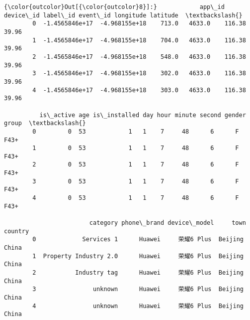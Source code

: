 \documentclass[11pt]{article}
\begin{document}
\begin{Verbatim}[commandchars=\\\{\}]
{\color{outcolor}Out[{\color{outcolor}8}]:}            app\_id      device\_id label\_id event\_id longitude latitude  \textbackslash{}
        0  -1.4565846e+17  -4.968155e+18    713.0   4633.0    116.38    39.96   
        1  -1.4565846e+17  -4.968155e+18    704.0   4633.0    116.38    39.96   
        2  -1.4565846e+17  -4.968155e+18    548.0   4633.0    116.38    39.96   
        3  -1.4565846e+17  -4.968155e+18    302.0   4633.0    116.38    39.96   
        4  -1.4565846e+17  -4.968155e+18    303.0   4633.0    116.38    39.96   
        
          is\_active age is\_installed day hour minute second gender group  \textbackslash{}
        0         0  53            1   1    7     48      6      F  F43+   
        1         0  53            1   1    7     48      6      F  F43+   
        2         0  53            1   1    7     48      6      F  F43+   
        3         0  53            1   1    7     48      6      F  F43+   
        4         0  53            1   1    7     48      6      F  F43+   
        
                        category phone\_brand device\_model     town country  
        0             Services 1      Huawei     荣耀6 Plus  Beijing   China  
        1  Property Industry 2.0      Huawei     荣耀6 Plus  Beijing   China  
        2           Industry tag      Huawei     荣耀6 Plus  Beijing   China  
        3                unknown      Huawei     荣耀6 Plus  Beijing   China  
        4                unknown      Huawei     荣耀6 Plus  Beijing   China  
\end{Verbatim}
            
\end{document}
